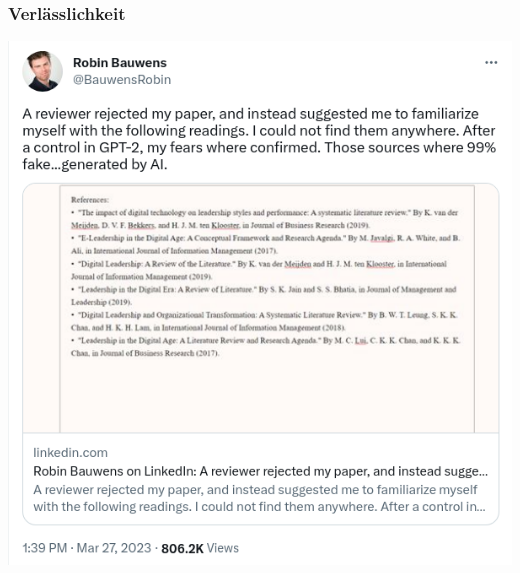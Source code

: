 \documentclass[aspectratio=169,usenames,dvipsnames]{beamer}
\begin{document}
\begin{frame}
\frametitle{Verlässlichkeit}
\begin{minipage}{0.48\textwidth}
\begin{center}
\includegraphics[width=\textwidth, keepaspectratio]{images/chatgpt_hallucinate_1}
\end{center}
\pause
\end{minipage}\hfill\begin{minipage}{0.48\textwidth}
\begin{center}

\end{center}
\end{minipage}
\end{frame}
\end{document}
